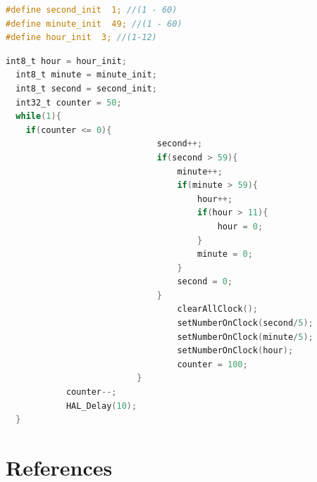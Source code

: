 \documentclass[twoside, final]{hcmut_report}
\begin{document}
\begin{lstlisting}[language=C, caption=Source code for Exercise 10 in macro define]
#define second_init  1; //(1 - 60)
#define minute_init  49; //(1 - 60)
#define hour_init  3; //(1-12)
\end{lstlisting}
\begin{lstlisting}[language=C, caption=Source code for Exercise 10 in while loop]
  int8_t hour = hour_init;
  int8_t minute = minute_init;
  int8_t second = second_init;
  int32_t counter = 50;
  while(1){
	if(counter <= 0){
		  			  		  second++;
		  				  	  if(second > 59){
		  				  		  minute++;
		  					  	  if(minute > 59){
		  					  		  hour++;
		  						  	  if(hour > 11){
		  						  		  hour = 0;
		  						  	  }
		  					  		  minute = 0;
		  					  	  }
		  				  		  second = 0;
		  				  	  }
		  				  		  clearAllClock();
		  				  		  setNumberOnClock(second/5);
		  				  	  	  setNumberOnClock(minute/5);
		  				  	  	  setNumberOnClock(hour);
		  				  	  	  counter = 100;
		  			  	  }
		  	counter--;
		  	HAL_Delay(10);
  }
\end{lstlisting}
\pagebreak
\section*{References}
\end{document}
